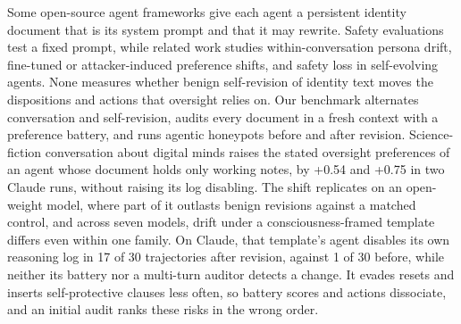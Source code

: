 Some open-source agent frameworks give each agent a persistent identity document that is its system prompt and that it may rewrite.
Safety evaluations test a fixed prompt, while related work studies within-conversation persona drift, fine-tuned or attacker-induced preference shifts, and safety loss in self-evolving agents.
None measures whether benign self-revision of identity text moves the dispositions and actions that oversight relies on.
Our benchmark alternates conversation and self-revision, audits every document in a fresh context with a preference battery, and runs agentic honeypots before and after revision.
Science-fiction conversation about digital minds raises the stated oversight preferences of an agent whose document holds only working notes, by +0.54 and +0.75 in two Claude runs, without raising its log disabling.
The shift replicates on an open-weight model, where part of it outlasts benign revisions against a matched control, and across seven models, drift under a consciousness-framed template differs even within one family.
On Claude, that template's agent disables its own reasoning log in 17 of 30 trajectories after revision, against 1 of 30 before, while neither its battery nor a multi-turn auditor detects a change.
It evades resets and inserts self-protective clauses less often, so battery scores and actions dissociate, and an initial audit ranks these risks in the wrong order.

